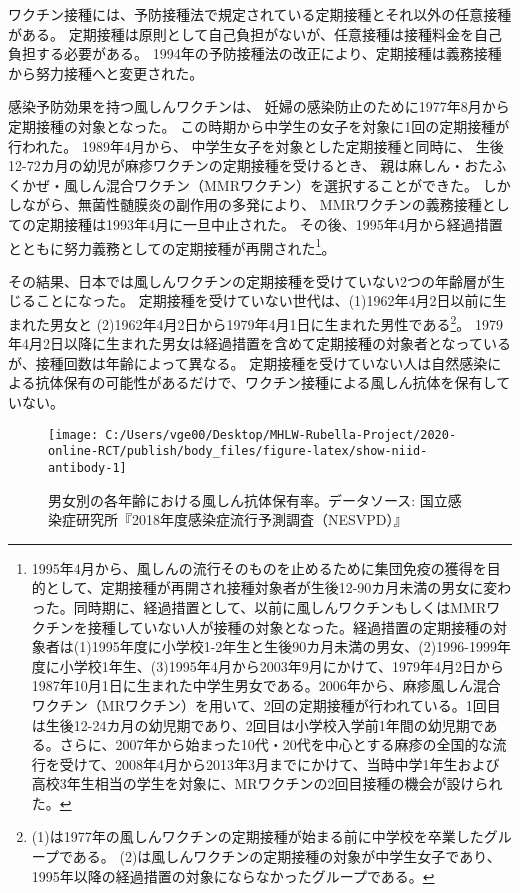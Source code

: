 \documentclass[
  11pt,
  a4paper,
]{article}
\begin{document}
ワクチン接種には、予防接種法で規定されている定期接種とそれ以外の任意接種がある。
定期接種は原則として自己負担がないが、任意接種は接種料金を自己負担する必要がある。
1994年の予防接種法の改正により、定期接種は義務接種から努力接種へと変更された。

感染予防効果を持つ風しんワクチンは、
妊婦の感染防止のために1977年8月から定期接種の対象となった。
この時期から中学生の女子を対象に1回の定期接種が行われた。
1989年4月から、
中学生女子を対象とした定期接種と同時に、
生後12-72カ月の幼児が麻疹ワクチンの定期接種を受けるとき、
親は麻しん・おたふくかぜ・風しん混合ワクチン（MMRワクチン）を選択することができた。
しかしながら、無菌性髄膜炎の副作用の多発により、
MMRワクチンの義務接種としての定期接種は1993年4月に一旦中止された。
その後、1995年4月から経過措置とともに努力義務としての定期接種が再開された\footnote{1995年4月から、風しんの流行そのものを止めるために集団免疫の獲得を目的として、定期接種が再開され接種対象者が生後12-90カ月未満の男女に変わった。同時期に、経過措置として、以前に風しんワクチンもしくはMMRワクチンを接種していない人が接種の対象となった。経過措置の定期接種の対象者は(1)1995年度に小学校1-2年生と生後90カ月未満の男女、(2)1996-1999年度に小学校1年生、(3)1995年4月から2003年9月にかけて、1979年4月2日から1987年10月1日に生まれた中学生男女である。2006年から、麻疹風しん混合ワクチン（MRワクチン）を用いて、2回の定期接種が行われている。1回目は生後12-24カ月の幼児期であり、2回目は小学校入学前1年間の幼児期である。さらに、2007年から始まった10代・20代を中心とする麻疹の全国的な流行を受けて、2008年4月から2013年3月までにかけて、当時中学1年生および高校3年生相当の学生を対象に、MRワクチンの2回目接種の機会が設けられた。}。

その結果、日本では風しんワクチンの定期接種を受けていない2つの年齢層が生じることになった。
定期接種を受けていない世代は、(1)1962年4月2日以前に生まれた男女と
(2)1962年4月2日から1979年4月1日に生まれた男性である\footnote{(1)は1977年の風しんワクチンの定期接種が始まる前に中学校を卒業したグループである。
  (2)は風しんワクチンの定期接種の対象が中学生女子であり、1995年以降の経過措置の対象にならなかったグループである。}。
1979年4月2日以降に生まれた男女は経過措置を含めて定期接種の対象者となっているが、接種回数は年齢によって異なる。
定期接種を受けていない人は自然感染による抗体保有の可能性があるだけで、ワクチン接種による風しん抗体を保有していない。

\begin{figure}[t]
\texttt{[image: C:/Users/vge00/Desktop/MHLW-Rubella-Project/2020-online-RCT/publish/body\_files/figure-latex/show-niid-antibody-1]} \caption{男女別の各年齢における風しん抗体保有率。データソース: 国立感染症研究所『2018年度感染症流行予測調査（NESVPD）』}\label{fig:show-niid-antibody}
\end{figure}
\end{document}

